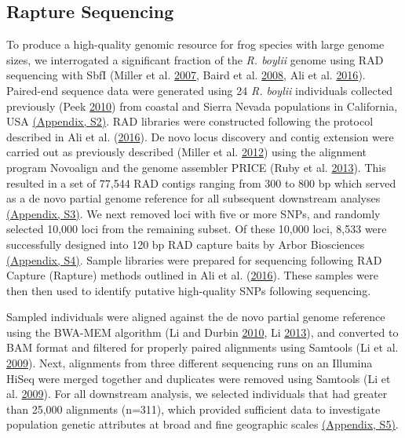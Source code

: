 \documentclass[proquest,12pt,final]{ucthesis-CA2012} %
\begin{document}
\begin{ucmainmatter}
\hypertarget{rapture2}{%
\subsection{Rapture Sequencing}\label{rapture2}}

To produce a high-quality genomic resource for frog species with large
genome sizes, we interrogated a significant fraction of the \emph{R.
boylii} genome using RAD sequencing with SbfI (Miller et al.
\protect\hyperlink{ref-miller_rapid_2007}{2007}, Baird et al.
\protect\hyperlink{ref-baird_rapid_2008}{2008}, Ali et al.
\protect\hyperlink{ref-ali_rad_2016}{2016}). Paired-end sequence data
were generated using 24 \emph{R. boylii} individuals collected
previously (Peek \protect\hyperlink{ref-peek_landscape_2010}{2010}) from
coastal and Sierra Nevada populations in California, USA
\protect\hyperlink{supptables}{(Appendix, S2)}. RAD libraries were
constructed following the protocol described in Ali et al.
(\protect\hyperlink{ref-ali_rad_2016}{2016}). De novo locus discovery
and contig extension were carried out as previously described (Miller et
al. \protect\hyperlink{ref-miller_conserved_2012}{2012}) using the
alignment program Novoalign and the genome assembler PRICE (Ruby et al.
\protect\hyperlink{ref-ruby_price_2013}{2013}). This resulted in a set
of 77,544 RAD contigs ranging from 300 to 800 bp which served as a de
novo partial genome reference for all subsequent downstream analyses
\protect\hyperlink{supptables}{(Appendix, S3)}. We next removed loci
with five or more SNPs, and randomly selected 10,000 loci from the
remaining subset. Of these 10,000 loci, 8,533 were successfully designed
into 120 bp RAD capture baits by Arbor Biosciences
\protect\hyperlink{supptables}{(Appendix, S4)}. Sample libraries were
prepared for sequencing following RAD Capture (Rapture) methods outlined
in Ali et al. (\protect\hyperlink{ref-ali_rad_2016}{2016}). These
samples were then then used to identify putative high-quality SNPs
following sequencing.

Sampled individuals were aligned against the de novo partial genome
reference using the BWA-MEM algorithm (Li and Durbin
\protect\hyperlink{ref-li_fast_2010}{2010}, Li
\protect\hyperlink{ref-li_aligning_2013}{2013}), and converted to BAM
format and filtered for properly paired alignments using Samtools (Li et
al. \protect\hyperlink{ref-li_sequence_2009}{2009}). Next, alignments
from three different sequencing runs on an Illumina HiSeq were merged
together and duplicates were removed using Samtools (Li et al.
\protect\hyperlink{ref-li_sequence_2009}{2009}). For all downstream
analysis, we selected individuals that had greater than 25,000
alignments (n=311), which provided sufficient data to investigate
population genetic attributes at broad and fine geographic scales
\protect\hyperlink{supptables}{(Appendix, S5)}.


\end{ucmainmatter}
\end{document}
